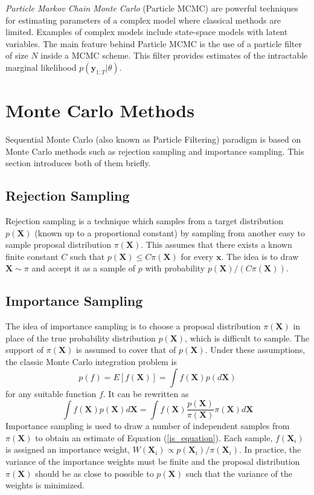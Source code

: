 \documentclass[11pt,a4,twosided,singlespacing,titlepagenumber=on]{scrreprt}
\numberwithin{equation}{chapter} %
\theoremstyle{remark}
\newcommand{\matr}[1]{\mathbf{#1}}
\begin{document}
\textit{Particle Markov Chain Monte Carlo} (Particle MCMC) are powerful techniques for estimating parameters of a complex model where classical methods are limited. Examples of complex models include state-space models with latent variables. The main feature behind Particle MCMC is the use of a particle filter of size $N$ inside a MCMC scheme. This filter provides estimates of the intractable marginal likelihood $p(\matr{y}_{1:T}|\theta)$.

\section{Monte Carlo Methods}
\label{section:mc}
Sequential Monte Carlo (also known as Particle Filtering) paradigm is based on Monte Carlo methods such as rejection sampling and importance sampling. This section introduces both of them briefly.

\subsection{Rejection Sampling}
Rejection sampling is a technique which samples from a target distribution $p(\matr{X})$ (known up to a proportional constant) by sampling from another easy to sample proposal distribution $\pi(\matr{X})$. This assumes that there exists a known finite constant $C$ such that $p(\matr{X}) \leq C \pi(\matr{X})$ for every $\matr{x}$. The idea is to draw $\matr{X} \sim \pi$ and accept it as a sample of $p$ with probability $p(\matr{X}) / ( C \pi(\matr{X}))$.

\subsection{Importance Sampling}
The idea of importance sampling is to choose a proposal distribution $\pi(\matr{X})$ in place of the true probability distribution $p(\matr{X})$, which is difficult to sample. The support of $\pi(\matr{X})$ is assumed to cover that of $p(\matr{X})$. Under these assumptions, the classic Monte Carlo integration problem is
\begin{equation}
p(f) = E[f(\matr{X})] = \int f(\matr{X})p(d\matr{X})
\end{equation}
for any suitable function $f$. It can be rewritten as
\begin{equation}
\int f(\matr{X})p(\matr{X})d\matr{X} = \int f(\matr{X}) \frac{p(\matr{X})}{\pi(\matr{X})} \pi(\matr{X}) d\matr{X} \label{is_equation}
\end{equation}
Importance sampling is used to draw a number of independent samples from $\pi(\matr{X})$ to obtain an estimate of Equation (\ref{is_equation}). Each sample, $f(\matr{X}_i)$ is assigned an importance weight, $W(\matr{X}_i) \propto p(\matr{X}_i)/\pi(\matr{X}_i)$. In practice, the variance of the importance weights must be finite and the proposal distribution $\pi(\matr{X})$ should be as close to possible to $p(\matr{X})$ such that the variance of the weights is minimized. 
\end{document}
